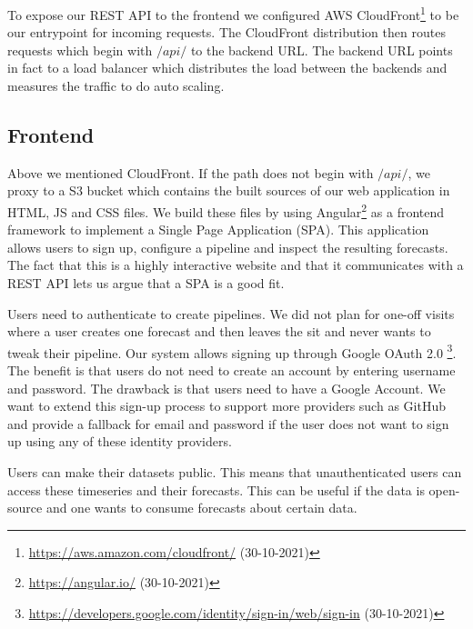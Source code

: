 To expose our REST API to the frontend we configured AWS CloudFront\footnote{\url{https://aws.amazon.com/cloudfront/} (30-10-2021)} to be our entrypoint for incoming requests. The CloudFront distribution then routes requests which begin with $/api/$ to the backend URL. The backend URL points in fact to a load balancer which distributes the load between the backends and measures the traffic to do auto scaling.

\subsection{Frontend}

Above we mentioned CloudFront. If the path does not begin with $/api/$, we proxy to a S3 bucket which contains the built sources of our web application in HTML, JS and CSS files. We build these files by using Angular\footnote{\url{https://angular.io/} (30-10-2021)} as a frontend framework to implement a Single Page Application (SPA). This application allows users to sign up, configure a pipeline and inspect the resulting forecasts. The fact that this is a highly interactive website and that it communicates with a REST API lets us argue that a SPA is a good fit.

Users need to authenticate to create pipelines. We did not plan for one-off visits where a user creates one forecast and then leaves the sit and never wants to tweak their pipeline. Our system allows signing up through Google OAuth 2.0 \footnote{\url{https://developers.google.com/identity/sign-in/web/sign-in} (30-10-2021)}. The benefit is that users do not need to create an account by entering username and password. The drawback is that users need to have a Google Account. We want to extend this sign-up process to support more providers such as GitHub and provide a fallback for email and password if the user does not want to sign up using any of these identity providers.

Users can make their datasets public. This means that unauthenticated users can access these timeseries and their forecasts. This can be useful if the data is open-source and one wants to consume forecasts about certain data.
